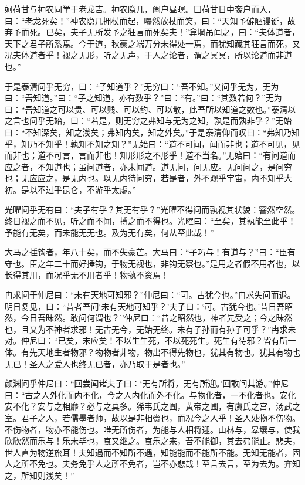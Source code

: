 \documentclass[]{article}
\begin{document}
妸荷甘与神农同学于老龙吉。神农隐几，阖户昼瞑。囗荷甘日中奓户而入，曰：``老龙死矣！''神农隐几拥杖而起，嚗然放杖而笑，曰：``天知予僻陋谩诞，故弃予而死。已矣，夫子无所发予之狂言而死矣夫！''弇堈吊闻之，曰：``夫体道者，天下之君子所系焉。今于道，秋豪之端万分未得处一焉，而犹知藏其狂言而死，又况夫体道者乎！视之无形，听之无声，于人之论者，谓之冥冥，所以论道而非道也。''

于是泰清问乎无穷，曰：``子知道乎？''无穷曰：``吾不知。''又问乎无为，无为曰：``吾知道。''曰：``子之知道，亦有数乎？''曰：``有。''曰：``其数若何？''无为曰：``吾知道之可以贵、可以贱、可以约、可以散，此吾所以知道之数也。''泰清以之言也问乎无始，曰：``若是，则无穷之弗知与无为之知，孰是而孰非乎？''无始曰：``不知深矣，知之浅矣；弗知内矣，知之外矣。''于是泰清仰而叹曰：``弗知乃知乎，知乃不知乎！孰知不知之知？''无始曰：``道不可闻，闻而非也；道不可见，见而非也；道不可言，言而非也！知形形之不形乎！道不当名。''无始曰：``有问道而应之者，不知道也；虽问道者，亦未闻道。道无问，问无应。无问问之，是问穷也；无应应之，是无内也。以无内待问穷，若是者，外不观乎宇宙，内不知乎大初。是以不过乎昆仑，不游乎太虚。''

光曜问乎无有曰：``夫子有乎？其无有乎？''光曜不得问而孰视其状貌：窨然空然。终日视之而不见，听之而不闻，搏之而不得也。光曜曰：``至矣，其孰能至此乎！予能有无矣，而未能无无也。及为无有矣，何从至此哉！''

大马之捶钩者，年八十矣，而不失豪芒。大马曰：``子巧与！有道与？''曰：``臣有守也。臣之年二十而好捶钩，于物无视也，非钩无察也。''是用之者假不用者也，以长得其用，而况乎无不用者乎！物孰不资焉！

冉求问于仲尼曰：``未有天地可知邪？''仲尼曰：``可。古犹今也。''冉求失问而退。明日复见，曰：``昔者吾问`未有天地可知乎？'夫子曰：`可。古犹今也。'昔日吾昭然，今日吾昧然。敢问何谓也？''仲尼曰：``昔之昭然也，神者先受之；今之昧然也，且又为不神者求邪！无古无今，无始无终。未有子孙而有孙子可乎？''冉求未对。仲尼曰：``已矣，末应矣！不以生生死，不以死死生。死生有待邪？皆有所一体。有先天地生者物邪？物物者非物，物出不得先物也，犹其有物也。犹其有物也无已！圣人之爱人也终无已者，亦乃取于是者也。''

颜渊问乎仲尼曰：``回尝闻诸夫子曰：`无有所将，无有所迎。'回敢问其游。''仲尼曰：``古之人外化而内不化，今之人内化而外不化。与物化者，一不化者也。安化安不化？安与之相靡？必与之莫多。狶韦氏之囿，黄帝之圃，有虞氏之宫，汤武之室。君子之人，若儒墨者师，故以是非相赍也，而况今之人乎！圣人处物不伤物。不伤物者，物亦不能伤也。唯无所伤者，为能与人相将迎。山林与，皋壤与，使我欣欣然而乐与！乐未毕也，哀又继之。哀乐之来，吾不能御，其去弗能止。悲夫，世人直为物逆旅耳！夫知遇而不知所不遇，知能能而不能所不能。无知无能者，固人之所不免也。夫务免乎人之所不免者，岂不亦悲哉！至言去言，至为去为。齐知之，所知则浅矣！''
\end{document}
